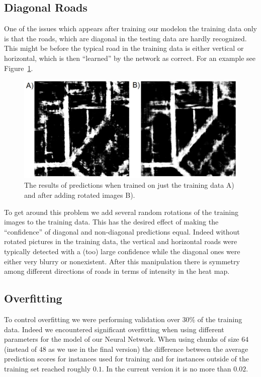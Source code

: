 \documentclass[10pt,conference,compsocconf]{IEEEtran}
\begin{document}
\subsection{Diagonal Roads}
One of the issues which appears after training our modelon the training data  only  is that the roads, which are diagonal in the testing data are hardly recognized. This might be before the typical road in the training data is either vertical or horizontal, which is then ``learned'' by the network as correct. For an example see Figure~\ref{fig:diagonal}.
\begin{figure}
\includegraphics[scale=0.3]{diagonal.png}
\caption{The results of predictions when trained on just the training data A) and after adding rotated images B).}
\vspace{2mm}
\label{fig:diagonal}
\end{figure}
To get around this problem we add several random rotations of the training images to the training data. This has the desired effect of making the ``confidence'' of diagonal and non-diagonal predictions equal. Indeed without rotated pictures in the training data, the vertical and horizontal roads were typically detected with a (too) large confidence while the diagonal ones were either very blurry or nonexistent. After this manipulation there is symmetry among different directions of roads in terms of intensity in the heat map.

\subsection{Overfitting}
To control overfitting we were performing validation over $30\%$ of the training data. Indeed we encountered significant overfitting when using different parameters for the model of our Neural Network. When using chunks of size $64$ (instead of $48$ as we use in the final version) the difference between the average prediction scores for instances used for training and for instances outside of the training set reached roughly $0.1$. In the current version it is no more than $0.02$. 
\end{document}
